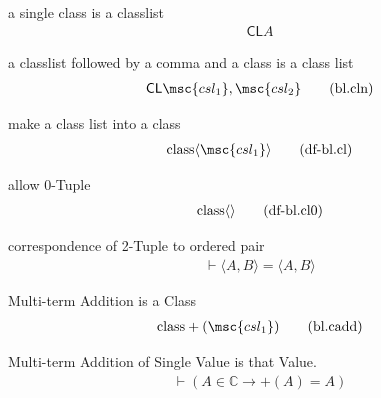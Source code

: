 \begin{metadefinition} a single class is a classlist
\begin{align}
\mathsf{CL} A\label{eq:bl.cla}\tag{bl.cla}
\end{align}
\end{metadefinition}

\begin{metadefinition} a classlist followed by a comma and a
class is a class list
\begin{align}
\mathsf{CL} \msc{csl_1} , \msc{csl_2}\label{eq:bl.cln}\tag{bl.cln}
\end{align}
\end{metadefinition}

\begin{metadefinition} make a class list into a class
\begin{align}
{\rm class} \langle \msc{csl_1} \rangle\label{eq:df-bl.cl}\tag{df-bl.cl}
\end{align}
\end{metadefinition}

\begin{metadefinition} allow 0-Tuple
\begin{align}
{\rm class} \langle \rangle\label{eq:df-bl.cl0}\tag{df-bl.cl0}
\end{align}
\end{metadefinition}

\begin{metadefinition} correspondence of 2-Tuple to
ordered pair
\begin{align}
\vdash \langle A , B \rangle = \langle A , B
    \rangle\label{eq:df-bl.2teqop}\tag{df-bl.2teqop}
\end{align}
\end{metadefinition}

\begin{metadefinition} Multi-term Addition is a Class
\begin{align}
{\rm class} +( \msc{csl_1} )\label{eq:bl.cadd}\tag{bl.cadd}
\end{align}
\end{metadefinition}

\begin{metadefinition} Multi-term Addition of Single Value
is that Value.
\begin{align}
\vdash ( A \in \mathbb{C} \rightarrow +( A ) = A
    )\label{eq:df-bl.add1}\tag{df-bl.add1}
\end{align}
\end{metadefinition}

